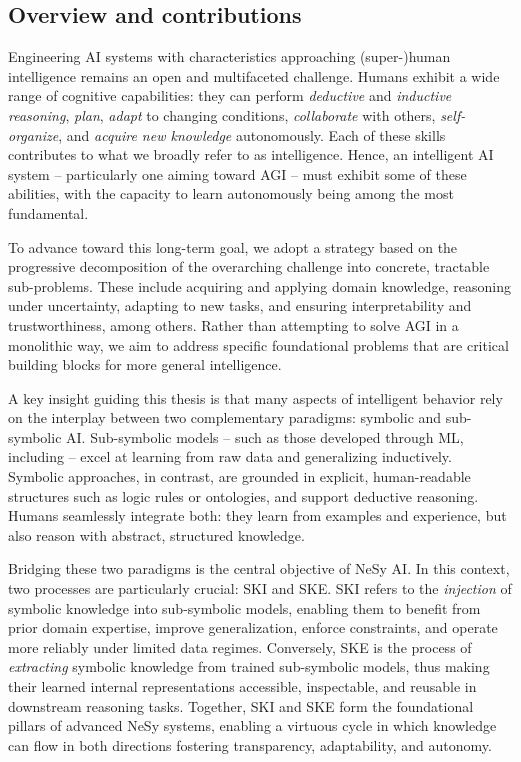 \begin{refsection}
\section{Overview and contributions}
\label{sec:overview-and-contributions}
%
Engineering \gls{AI} systems with characteristics approaching (super-)human intelligence remains an open and multifaceted challenge.
%
Humans exhibit a wide range of cognitive capabilities: they can perform \emph{deductive} and \emph{inductive reasoning}, \emph{plan}, \emph{adapt} to changing conditions, \emph{collaborate} with others, \emph{self-organize}, and \emph{acquire new knowledge} autonomously.
%
Each of these skills contributes to what we broadly refer to as intelligence.
%
Hence, an intelligent \gls{AI} system -- particularly one aiming toward \gls{AGI} -- must exhibit some of these abilities, with the capacity to learn autonomously being among the most fundamental.


To advance toward this long-term goal, we adopt a strategy based on the progressive decomposition of the overarching challenge into concrete, tractable sub-problems.
%
These include acquiring and applying domain knowledge, reasoning under uncertainty, adapting to new tasks, and ensuring interpretability and trustworthiness, among others.
%
Rather than attempting to solve \gls{AGI} in a monolithic way, we aim to address specific foundational problems that are critical building blocks for more general intelligence.


A key insight guiding this thesis is that many aspects of intelligent behavior rely on the interplay between two complementary paradigms: symbolic and sub-symbolic \gls{AI}.
%
Sub-symbolic models -- such as those developed through \gls{ML}, including  -- excel at learning from raw data and generalizing inductively.
%
Symbolic approaches, in contrast, are grounded in explicit, human-readable structures such as logic rules or ontologies, and support deductive reasoning.
%
Humans seamlessly integrate both: they learn from examples and experience, but also reason with abstract, structured knowledge.


Bridging these two paradigms is the central objective of \gls{NeSy} \gls{AI}.
%
In this context, two processes are particularly crucial: \gls{SKI} and \gls{SKE}.
%
\Gls{SKI} refers to the \emph{injection} of symbolic knowledge into sub-symbolic models, enabling them to benefit from prior domain expertise, improve generalization, enforce constraints, and operate more reliably under limited data regimes.
%
Conversely, \gls{SKE} is the process of \emph{extracting} symbolic knowledge from trained sub-symbolic models, thus making their learned internal representations accessible, inspectable, and reusable in downstream reasoning tasks.
%
Together, \gls{SKI} and \gls{SKE} form the foundational pillars of advanced \gls{NeSy} systems, enabling a virtuous cycle in which knowledge can flow in both directions fostering transparency, adaptability, and autonomy.



\end{refsection}
